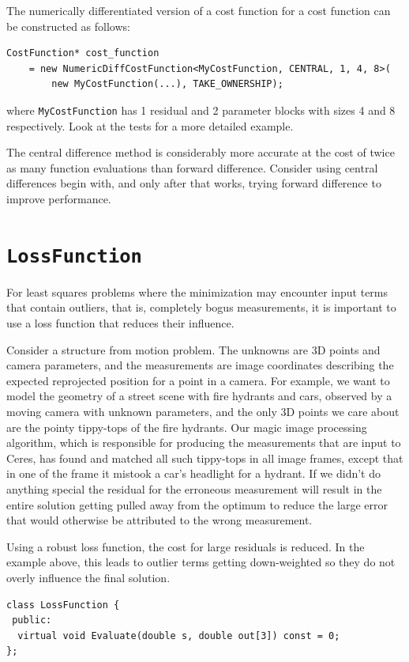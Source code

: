 The numerically differentiated version of a cost function for a cost function
can be constructed as follows:
\begin{verbatim}
CostFunction* cost_function
    = new NumericDiffCostFunction<MyCostFunction, CENTRAL, 1, 4, 8>(
        new MyCostFunction(...), TAKE_OWNERSHIP);
\end{verbatim}
where \texttt{MyCostFunction} has 1 residual and 2 parameter blocks with sizes 4 and 8
respectively. Look at the tests for a more detailed example.

The central difference method is considerably more accurate at the cost of
twice as many function evaluations than forward difference. Consider using
central differences begin with, and only after that works, trying forward
difference to improve performance.

\section{\texttt{LossFunction}}
 For least squares problems where the minimization may encounter
 input terms that contain outliers, that is, completely bogus
 measurements, it is important to use a loss function that reduces
 their influence.

 Consider a structure from motion problem. The unknowns are 3D
 points and camera parameters, and the measurements are image
 coordinates describing the expected reprojected position for a
 point in a camera. For example, we want to model the geometry of a
 street scene with fire hydrants and cars, observed by a moving
 camera with unknown parameters, and the only 3D points we care
 about are the pointy tippy-tops of the fire hydrants. Our magic
 image processing algorithm, which is responsible for producing the
 measurements that are input to Ceres, has found and matched all
 such tippy-tops in all image frames, except that in one of the
 frame it mistook a car's headlight for a hydrant. If we didn't do
 anything special  the
 residual for the erroneous measurement will result in the
 entire solution getting pulled away from the optimum to reduce
 the large error that would otherwise be attributed to the wrong
 measurement.

 Using a robust loss function, the cost for large residuals is
 reduced. In the example above, this leads to outlier terms getting
 down-weighted so they do not overly influence the final solution.

\begin{verbatim}
class LossFunction {
 public:
  virtual void Evaluate(double s, double out[3]) const = 0;
};
\end{verbatim}

